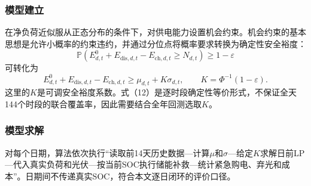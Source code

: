 \documentclass{cumcmthesis}
\begin{document}
\subsubsection{模型建立}

在净负荷近似服从正态分布的条件下，对供电能力设置机会约束。机会约束的基本思想是允许小概率的约束违约，并通过分位点将概率要求转换为确定性安全裕度\cite{charnes1959,bental2009}：
\begin{equation}
\mathbb P\left(E^0_{d,t}+E_{\mathrm{dis},d,t}-E_{\mathrm{ch},d,t}\geq N_{d,t}\right)\geq1-\varepsilon
\tag{11}
\end{equation}
可转化为
\begin{equation}
E^0_{d,t}+E_{\mathrm{dis},d,t}-E_{\mathrm{ch},d,t}
\geq\mu_{d,t}+K\sigma_{d,t},\qquad K=\Phi^{-1}(1-\varepsilon).
\tag{12}
\end{equation}
这里的$K$是可调安全裕度系数。式（12）是逐时段确定性等价形式，不保证全天144个时段的联合覆盖率，因此需要结合全年回测选取$K$。

\subsubsection{模型求解}

对每个日期，算法依次执行“读取前14天历史数据—计算$\mu$和$\sigma$—给定$K$求解日前LP—代入真实负荷和光伏—按当前SOC执行储能补救—统计紧急购电、弃光和成本”。日期间不传递真实SOC，符合本文逐日闭环的评价口径。
\end{document}
